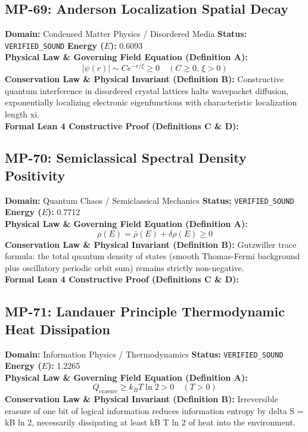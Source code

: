 \subsection{MP-69: Anderson Localization Spatial Decay}
\textbf{Domain:} Condensed Matter Physics / Disordered Media \hfill \textbf{Status:} \texttt{VERIFIED\_SOUND} \hfill \textbf{Energy ($E$):} 0.6093\\
\textbf{Physical Law \& Governing Field Equation (Definition A):}
\begin{equation*}
|\psi(r)| \sim C e^{-r/\xi} \ge 0 \quad (C \ge 0, \, \xi > 0)
\end{equation*}
\textbf{Conservation Law \& Physical Invariant (Definition B):}
Constructive quantum interference in disordered crystal lattices halts wavepacket diffusion, exponentially localizing electronic eigenfunctions with characteristic localization length xi.\\

\textbf{Formal Lean 4 Constructive Proof (Definitions C \& D):}


\vspace{1em}
\subsection{MP-70: Semiclassical Spectral Density Positivity}
\textbf{Domain:} Quantum Chaos / Semiclassical Mechanics \hfill \textbf{Status:} \texttt{VERIFIED\_SOUND} \hfill \textbf{Energy ($E$):} 0.7712\\
\textbf{Physical Law \& Governing Field Equation (Definition A):}
\begin{equation*}
\rho(E) = \bar{\rho}(E) + \delta\rho(E) \ge 0
\end{equation*}
\textbf{Conservation Law \& Physical Invariant (Definition B):}
Gutzwiller trace formula: the total quantum density of states (smooth Thomas-Fermi background plus oscillatory periodic orbit sum) remains strictly non-negative.\\

\textbf{Formal Lean 4 Constructive Proof (Definitions C \& D):}


\vspace{1em}
\subsection{MP-71: Landauer Principle Thermodynamic Heat Dissipation}
\textbf{Domain:} Information Physics / Thermodynamics \hfill \textbf{Status:} \texttt{VERIFIED\_SOUND} \hfill \textbf{Energy ($E$):} 1.2265\\
\textbf{Physical Law \& Governing Field Equation (Definition A):}
\begin{equation*}
Q_{\text{erasure}} \ge k_B T \ln 2 > 0 \quad (T > 0)
\end{equation*}
\textbf{Conservation Law \& Physical Invariant (Definition B):}
Irreversible erasure of one bit of logical information reduces information entropy by delta S = kB ln 2, necessarily dissipating at least kB T ln 2 of heat into the environment.\\

